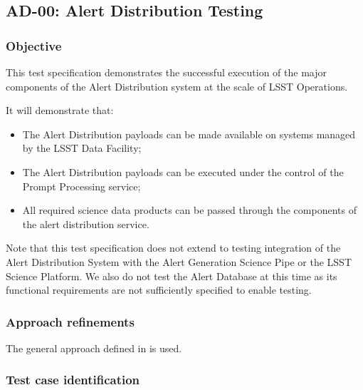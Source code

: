 \subsection{AD-00: Alert Distribution Testing}
\label{ad-00}

\subsubsection{Objective}

This test specification demonstrates the successful execution of the major components of the Alert Distribution system at the scale of LSST Operations.

It will demonstrate that:

\begin{itemize}

  \item{The Alert Distribution payloads 
	  can be made available on systems managed by the
  LSST Data Facility;}

  \item{The Alert Distribution payloads can be executed under the
  control of the Prompt Processing service;}

  \item{All required science data products can be passed through the components
	  of the alert distribution service.}

\end{itemize}

Note that this test specification does not extend to 
testing integration of the Alert Distribution System with the Alert Generation Science Pipe or the LSST Science Platform. 
We also do not test the Alert Database at this time as its functional requirements are not sufficiently specified to enable testing.

\subsubsection{Approach refinements}

The general approach defined in  is used.

\subsubsection{Test case identification}

